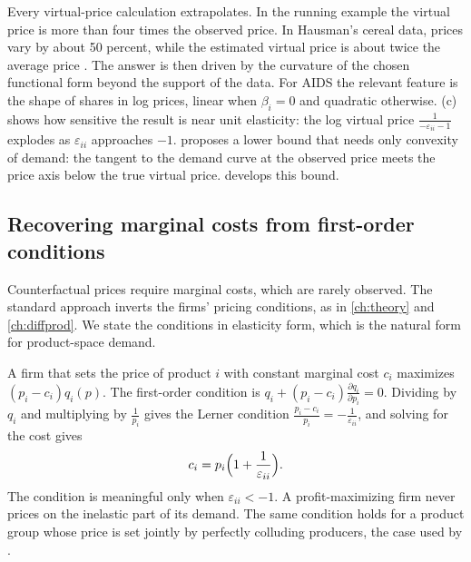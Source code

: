 \begin{remark}\label{rem:05-extrapolation}
Every virtual-price calculation extrapolates. In the running example the virtual price is more than four times
the observed price. In Hausman's cereal data, prices vary by about 50 percent, while the estimated virtual
price is about twice the average price \citep[p.~228]{Hausman1997}. The answer is
then driven by the curvature of the chosen functional form beyond the support of the data. For AIDS the
relevant feature is the shape of shares in log prices, linear when $\beta_i = 0$ and quadratic otherwise.
(c) shows how sensitive the
result is near unit elasticity: the log virtual price $\frac{1}{-\varepsilon_{ii} - 1}$ explodes as
$\varepsilon_{ii}$ approaches $-1$. \citet{Hausman1997} proposes a lower bound that needs only convexity of
demand: the tangent to the demand curve at the observed price meets the price axis below the true virtual price.
 develops this bound.
\end{remark}

\subsection{Recovering marginal costs from first-order conditions}\label{sec:05-welfare-supply}

Counterfactual prices require marginal costs, which are rarely observed. The standard approach inverts the
firms' pricing conditions, as in \cref{ch:theory} and \cref{ch:diffprod}. We state the conditions in
elasticity form, which is the natural form for product-space demand.

A firm that sets the price of product $i$ with constant marginal cost $c_i$ maximizes $(p_i - c_i)q_i(p)$. The
first-order condition is $q_i + (p_i - c_i)\frac{\partial q_i}{\partial p_i} = 0$. Dividing by $q_i$ and
multiplying by $\frac{1}{p_i}$ gives the Lerner condition
$\frac{p_i - c_i}{p_i} = -\frac{1}{\varepsilon_{ii}}$, and solving for the cost gives
\begin{equation}\label{eq:05-foc-single}
  c_i = p_i\Bigl(1 + \frac{1}{\varepsilon_{ii}}\Bigr).
\end{equation}
The condition is meaningful only when $\varepsilon_{ii} < -1$. A profit-maximizing firm never prices on the
inelastic part of its demand. The same condition holds for a product group whose price is set jointly by
perfectly colluding producers, the case used by \citet{ChaudhuriGoldbergJia2006}.

